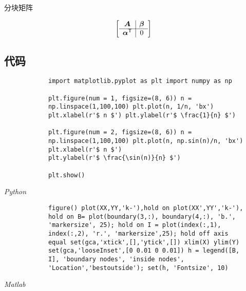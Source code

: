 \documentclass[a4paper, 12pt, UTF8]{ctexart}
\begin{document}
分块矩阵

\[
    \begin{bmatrix}
        \begin{array}{c | c}
          \boldsymbol{A}  &  \bm{\beta}  \\  \hline
          \bm{\alpha}^{\mathsf T}   &  0
        \end{array}
    \end{bmatrix}
\]

\clearpage
\begin{thebibliography}{99}
\end{thebibliography}

\clearpage

\begin{appendices}
    \section{代码}
    \begin{listing}[ht]
        \begin{verbatim}
            import matplotlib.pyplot as plt import numpy as np
    
            plt.figure(num = 1, figsize=(8, 6)) n =
            np.linspace(1,100,100) plt.plot(n, 1/n, 'bx')
            plt.xlabel(r'$ n $') plt.ylabel(r'$ \frac{1}{n} $')
    
            plt.figure(num = 2, figsize=(8, 6)) n =
            np.linspace(1,100,100) plt.plot(n, np.sin(n)/n, 'bx')
            plt.xlabel(r'$ n $')
            plt.ylabel(r'$ \frac{\sin(n)}{n} $')
    
            plt.show()
        \end{verbatim}
        \caption{\em Python}
    \end{listing}

    \begin{listing}[ht]
        \begin{verbatim}
            figure() plot(XX,YY,'k-'),hold on plot(XX',YY','k-'),
            hold on B= plot(boundary(3,:), boundary(4,:), 'b.',
            'markersize', 25); hold on I = plot(index(:,1),
            index(:,2), 'r.', 'markersize',25); hold off axis
            equal set(gca,'xtick',[],'ytick',[]) xlim(X) ylim(Y)
            set(gca,'looseInset',[0 0.01 0 0.01]) h = legend([B,
            I], 'boundary nodes', 'inside nodes',
            'Location','bestoutside'); set(h, 'Fontsize', 10)
        \end{verbatim}
        \caption{\em Matlab}
    \end{listing}
\end{appendices}
\end{document}
